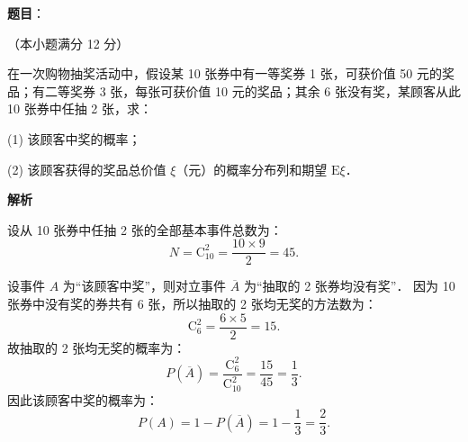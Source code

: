 \begin{answer}

\textbf{题目}：

（本小题满分 12 分）

在一次购物抽奖活动中，假设某 10 张券中有一等奖券 1 张，可获价值 50 元的奖品；有二等奖券 3 张，每张可获价值 10 元的奖品；其余 6 张没有奖，某顾客从此 10 张券中任抽 2 张，求：

(1) 该顾客中奖的概率；

(2) 该顾客获得的奖品总价值 $\xi$（元）的概率分布列和期望 $\mathrm{E}\xi$．

\textbf{解析}

设从 10 张券中任抽 2 张的全部基本事件总数为：
\nopagebreak[4]
\[
N = \mathrm{C}_{10}^2 = \frac{10 \times 9}{2} = 45.
\]


设事件 $A$ 为“该顾客中奖”，则对立事件 $\overline{A}$ 为“抽取的 2 张券均没有奖”．
因为 10 张券中没有奖的券共有 6 张，所以抽取的 2 张均无奖的方法数为：
\nopagebreak[4]
\[
\mathrm{C}_6^2 = \frac{6 \times 5}{2} = 15.
\]
故抽取的 2 张均无奖的概率为：
\nopagebreak[4]
\[
P(\overline{A}) = \frac{\mathrm{C}_6^2}{\mathrm{C}_{10}^2} = \frac{15}{45} = \frac{1}{3}.
\]
因此该顾客中奖的概率为：
\nopagebreak[4]
\[
P(A) = 1 - P(\overline{A}) = 1 - \frac{1}{3} = \frac{2}{3}.
\]



\end{answer}
